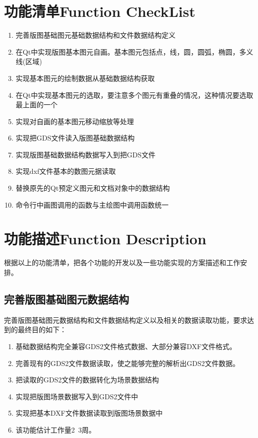 \section{功能清单Function CheckList} \label{SectArchFuncList}
\begin{enumerate}
	\item 完善版图基础图元基础数据结构和文件数据结构定义
	\item 在Qt中实现版图基本图元自画。基本图元包括点，线，圆，圆弧，椭圆，多义线(区域)
	\item 实现基本图元的绘制数据从基础数据结构获取
	\item 在Qt中实现基本图元的选取，要注意多个图元有重叠的情况，这种情况要选取最上面的一个
	\item 实现对自画的基本图元移动缩放等处理
	\item 实现把GDS文件读入版图基础数据结构
	\item 实现版图基础数据结构数据写入到把GDS文件
	\item 实现dxf文件基本的数图元据读取
	\item 替换原先的Qt预定义图元和文档对象中的数据结构
	\item 命令行中画图调用的函数与主绘图中调用函数统一
\end{enumerate}

\section{功能描述Function Description} \label{SectArchFuncDesc}
根据以上的功能清单，把各个功能的开发以及一些功能实现的方案描述和工作安排。

\subsection{完善版图基础图元数据结构} \label{SectArchTaskDataStrc} 
完善版图基础图元数据结构和文件数据结构定义以及相关的数据读取功能，要求达到的最终目的如下：
\begin{enumerate}
	\item 基础数据结构完全兼容GDS2文件格式数据、大部分兼容DXF文件格式。
	\item 完善现有的GDS2文件数据读取，使之能够完整的解析出GDS2文件数据。
	\item 把读取的GDS2文件的数据转化为场景数据结构
	\item 实现把版图场景数据写入到GDS2文件中
	\item 实现把基本DXF文件数据读取到版图场景数据中
	\item 该功能估计工作量2~3周。
\end{enumerate}

